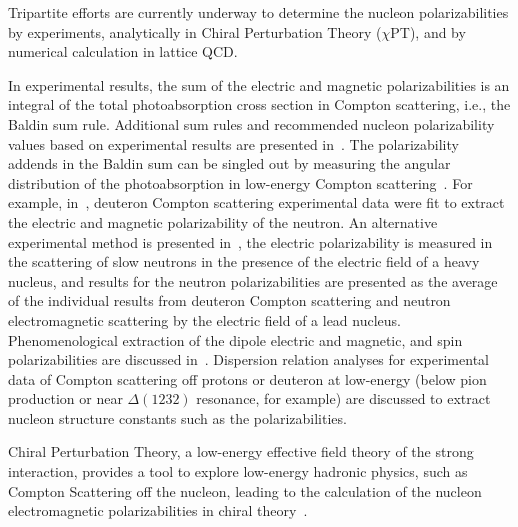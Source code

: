 Tripartite efforts are currently underway to determine the nucleon polarizabilities
by experiments, analytically in Chiral Perturbation Theory ($\chi$PT), and by numerical calculation in lattice QCD.

In experimental results, the sum of the electric and magnetic polarizabilities is
an integral of the total photoabsorption cross section in Compton scattering,
i.e., the Baldin sum rule. Additional sum rules and recommended nucleon polarizability values
based on experimental results are presented in~\cite{Schumacher:2019ikn}.
The polarizability addends in the Baldin sum can be singled out by measuring the angular
distribution of the photoabsorption in low-energy Compton scattering~\cite{Hagelstein:2020vog,Levchuk:1999zy}.
For example, in~\cite{Levchuk:1999zy}, deuteron Compton scattering experimental data were fit to
extract the electric and magnetic polarizability of the neutron. An alternative experimental method
is presented in~\cite{Schumacher:2019ikn}, the electric polarizability is measured in the scattering of slow
neutrons in the presence of the electric field of a heavy nucleus, and results for the neutron
polarizabilities are presented as the average of the individual results from deuteron Compton
scattering and neutron electromagnetic scattering by the electric field of a lead nucleus.
Phenomenological extraction of the dipole electric and magnetic, and spin polarizabilities are discussed in~\cite{Holstein:1999uu, Drechsel:2002ar, Hildebrandt:2003fm, Schumacher:2005an, Pasquini:2007hf, Pasquini:2010zr, Griesshammer:2012we, McGovern:2012ew, Holstein:2013kia, COMPTONMAX-lab:2014cve, A2:2014iky, Gryniuk:2015eza, Gryniuk:2016gnm, Hagelstein:2015egb, Griesshammer:2017txw, Pasquini:2017ehj, Pasquini:2018wbl, Pasquini:2019nnx, Miskimen:2019kwu, Martel:2019tgp, A2:2019bqm, Melendez:2020ikd}. Dispersion relation analyses for experimental data of Compton scattering off protons or deuteron at low-energy 
(below pion production or near $\Delta(1232)$ resonance, for example) are discussed to extract nucleon
structure constants such as the polarizabilities.

 Chiral Perturbation Theory, a low-energy effective field theory of the
strong interaction, provides a tool to explore low-energy hadronic physics, such as Compton
Scattering off the nucleon, leading to the calculation of the nucleon electromagnetic polarizabilities
in chiral theory~\cite{Hagelstein:2020vog, Bernard:1991rq, Bernard:1991ru}.

